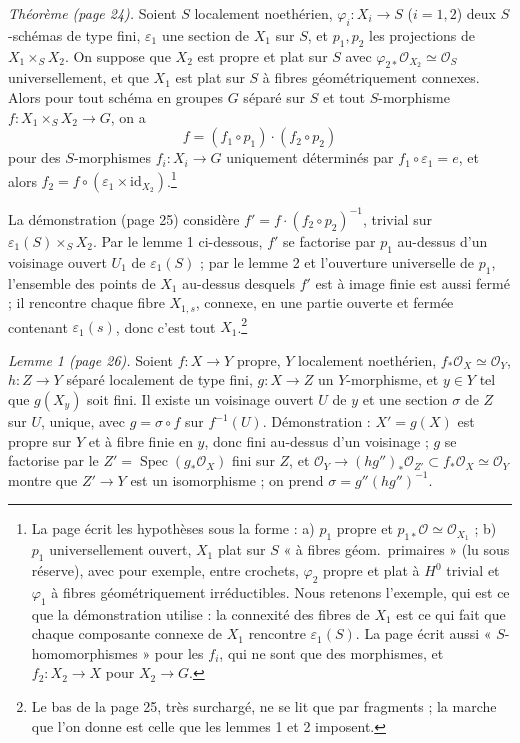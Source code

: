 \documentclass[11pt,a4paper]{article}
\begin{document}
\emph{Théorème (page 24).} Soient $S$ localement noethérien,
$\varphi_i \colon X_i \to S$ ($i = 1, 2$) deux $S$-schémas de type fini, $\varepsilon_1$ une section de $X_1$ sur $S$,
et $p_1, p_2$ les projections de $X_1 \times_S X_2$. On suppose que $X_2$ est
propre et plat sur $S$ avec $\varphi_{2*}\mathcal{O}_{X_2} \simeq \mathcal{O}_S$
universellement, et que $X_1$ est plat sur $S$ à fibres géométriquement
connexes. Alors pour tout schéma en groupes $G$ séparé sur $S$ et tout
$S$-morphisme $f \colon X_1 \times_S X_2 \to G$, on a
\[
f = (f_1 \circ p_1)\cdot(f_2 \circ p_2)
\]
pour des $S$-morphismes $f_i \colon X_i \to G$ uniquement déterminés par
$f_1 \circ \varepsilon_1 = e$, et alors $f_2 = f \circ (\varepsilon_1 \times \mathrm{id}_{X_2})$.\footnote{La
page écrit les hypothèses sous la forme : a) $p_1$ propre et
$p_{1*}\mathcal{O} \simeq \mathcal{O}_{X_1}$ ; b) $p_1$ universellement ouvert,
$X_1$ plat sur $S$ « à fibres géom.\ primaires » (lu sous réserve), avec pour
exemple, entre crochets, $\varphi_2$ propre et plat à $H^0$ trivial et
$\varphi_1$ à fibres géométriquement irréductibles. Nous retenons l'exemple,
qui est ce que la démonstration utilise : la connexité des fibres de $X_1$ est
ce qui fait que chaque composante connexe de $X_1$ rencontre
$\varepsilon_1(S)$. La page écrit aussi « $S$-homomorphismes » pour les $f_i$,
qui ne sont que des morphismes, et $f_2 \colon X_2 \to X$ pour $X_2 \to G$.}

La démonstration (page 25) considère
$f' = f \cdot (f_2 \circ p_2)^{-1}$, trivial sur $\varepsilon_1(S) \times_S X_2$.
Par le lemme 1 ci-dessous, $f'$ se factorise par $p_1$ au-dessus d'un voisinage
ouvert $U_1$ de $\varepsilon_1(S)$ ; par le lemme 2 et l'ouverture universelle
de $p_1$, l'ensemble des points de $X_1$ au-dessus desquels $f'$ est à image
finie est aussi fermé ; il rencontre chaque fibre $X_{1,s}$, connexe, en une
partie ouverte et fermée contenant $\varepsilon_1(s)$, donc c'est tout $X_1$.\footnote{Le bas de la page 25, très
surchargé, ne se lit que par fragments ; la marche que l'on donne est celle que
les lemmes 1 et 2 imposent.}

\emph{Lemme 1 (page 26).} Soient $f \colon X \to Y$ propre, $Y$ localement
noethérien, $f_*\mathcal{O}_X \simeq \mathcal{O}_Y$, $h \colon Z \to Y$ séparé
localement de type fini, $g \colon X \to Z$ un $Y$-morphisme, et $y \in Y$ tel
que $g(X_y)$ soit fini. Il existe un voisinage ouvert $U$ de $y$ et une section
$\sigma$ de $Z$ sur $U$, unique, avec $g = \sigma \circ f$ sur $f^{-1}(U)$.
Démonstration : $X' = g(X)$ est propre sur $Y$ et à fibre finie en $y$, donc
fini au-dessus d'un voisinage ; $g$ se factorise par le $Z' = \operatorname{Spec}(g_*\mathcal{O}_X)$
fini sur $Z$, et
$\mathcal{O}_Y \to (h g'')_*\mathcal{O}_{Z'} \subset f_*\mathcal{O}_X \simeq \mathcal{O}_Y$
montre que $Z' \to Y$ est un isomorphisme ; on prend
$\sigma = g''(hg'')^{-1}$.
\end{document}
